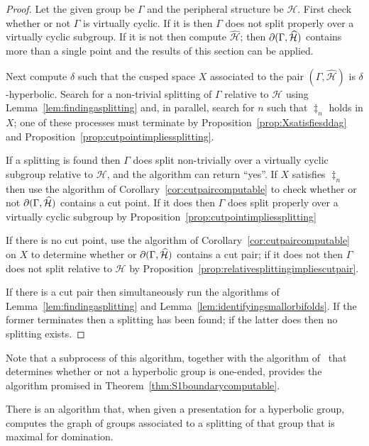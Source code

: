 \begin{proof} Let the given group be $\Gamma$ and the peripheral structure be
$\mathcal{H}$. First check whether or not $\Gamma$ is virtually cyclic. If it
is then $\Gamma$ does not split properly over a virtually cyclic subgroup.
If it is not then compute $\widehat{\mathcal{H}}$; then $\partial(\Gamma,
\widehat{\mathcal{H}})$ contains more than a single point and the results
of this section can be applied.

Next compute $\delta$ such that the cusped space $X$ associated to the pair
$(\Gamma, \widehat{\mathcal{H}})$ is $\delta$-hyperbolic.  Search for a
non-trivial splitting of $\Gamma$ relative to $\mathcal{H}$ using
Lemma~\ref{lem:findingasplitting} and, in parallel, search for $n$ such that
$\ddag_n$ holds in $X$; one of these processes must terminate by
Proposition~\ref{prop:Xsatisfiesddag} and
Proposition~\ref{prop:cutpointimpliessplitting}.

If a splitting is found then $\Gamma$ does split non-trivially over a virtually
cyclic subgroup relative to $\mathcal{H}$, and the algorithm can return
``yes''. If $X$ satisfies $\ddag_n$ then use the algorithm of
Corollary~\ref{cor:cutpaircomputable} to check whether or not
$\partial(\Gamma, \widehat{\mathcal{H}})$ contains a cut point. If it does then $\Gamma$
does split properly over a virtually cyclic subgroup by
Proposition~\ref{prop:cutpointimpliessplitting}

If there is no cut point, use the algorithm of
Corollary~\ref{cor:cutpaircomputable} on $X$ to determine whether or
$\partial(\Gamma, \widehat{\mathcal{H}})$ contains a cut pair; if it does not then
$\Gamma$ does not split relative to $\mathcal{H}$ by
Proposition~\ref{prop:relativesplittingimpliescutpair}.

If there is a cut pair then simultaneously run the algorithms of
Lemma~\ref{lem:findingasplitting} and
Lemma~\ref{lem:identifyingsmallorbifolds}. If the former terminates then a
splitting has been found; if the latter does then no splitting exists.
\end{proof}

Note that a subprocess of this algorithm, together with the algorithm
of~\cite{gerasimov} that determines whether or not a hyperbolic group is
one-ended, provides the algorithm promised in
Theorem~\ref{thm:S1boundarycomputable}.

\begin{prop}\label{prop:maximalsplittingcomputable} There is an algorithm that,
when given a presentation for a hyperbolic group, computes the graph of groups
associated to a splitting of that group that is maximal for domination.
\end{prop}

